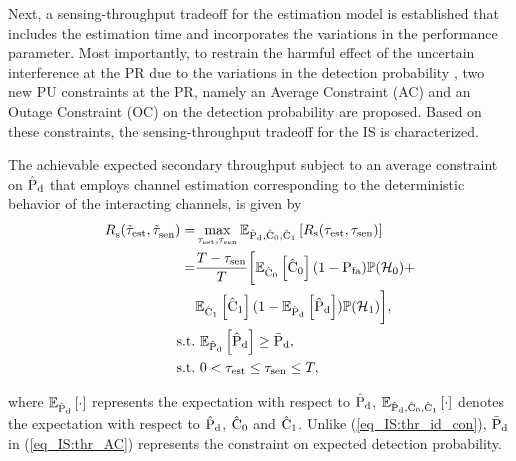 Next, a sensing-throughput tradeoff for the estimation model is established that includes the estimation time and incorporates the variations in the performance parameter. Most importantly, to restrain the harmful effect of the uncertain interference at the PR due to the variations in the detection probability%
, two new PU constraints at the PR, namely an Average Constraint (AC) and an Outage Constraint (OC) on the detection probability are proposed. Based on these constraints, the sensing-throughput tradeoff for the IS is characterized.


\begin{theorem} \label{th_IS:th1}
\normalfont
The achievable expected secondary throughput subject to an average constraint on $\hat{\text{P}}_{\text{d}}$ that employs channel estimation corresponding to the deterministic behavior of the interacting channels, is given by 
\begin{align}
\trsac(\ttest, \ttsenac) =& \maxi_{\tc{\test}, \tsen} \e{\epd, \ecz, \eco}{\rs(\test, \tsen)} \nonumber \\ 
\quad =& \frac{T- \tsen}{T} \bigg[ \e{\ecz}{\ecz} (1 - \pfa) \phz + \nonumber \\ \quad & \e{\eco}{\eco} (1 - \e{\epd}{\epd}) \pho  \bigg], \label{eq_IS:thr_AC} \\
\text{s.t.} & \text{ }  \e{\epd}{\epd} \ge \pdd, \label{eq_IS:AC} \\
\tc{\text{s.t.}} & \text{ }  \tc{0 < \test \le \tsen \le T,} \nonumber
\end{align}
\end{theorem}
where ${\mathbb E}_{\hat{\text{P}}_{\text{d}}}\left[ \cdot \right]$ represents the expectation with respect to $\hat{\text{P}}_{\text{d}}$, ${\mathbb E}_{\hat{\text{P}}_{\text{d}}, \hat{\text{C}}_{\text{0}}, \hat{\text{C}}_{\text{1}}}\left[ \cdot \right]$ denotes the expectation with respect to $\hat{\text{P}}_{\text{d}}$, $\hat{\text{C}}_{\text{0}}$ and $\hat{\text{C}}_{\text{1}}$. Unlike (\ref{eq_IS:thr_id_con}), $\bar{\text{P}}_{\text{d}}$ in (\ref{eq_IS:thr_AC}) represents the constraint on expected detection probability.

